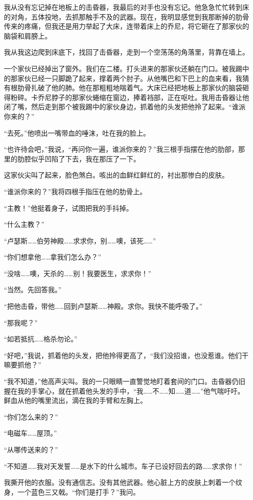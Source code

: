 \documentclass[AutoFakeBold=true]{book}
\begin{document}
我从没有忘记掉在地板上的击昏器，我最后的对手也没有忘记。他急急忙忙转到床的对角，五体投地，去抓那触手不及的武器。现在，我明显感觉到我那断掉的肋骨传来的疼痛，但我还是用力举起了大床，连带着床上的乔尼，将它砸在了那家伙的脑袋和肩膀上。

我从我这边爬到床底下，找回了击昏器，走到一个空荡荡的角落里，背靠在墙上。

一个家伙已经掉出了窗外。我们在二楼。打头进来的那家伙还躺在门口。被我踢中的那家伙已经一只脚跪了起来，撑着两个肘子。从他嘴巴和下巴上的血来看，我猜有根肋骨扎破了他的肺。他在那粗粗地喘着气。大床已经把地板上那家伙的脑袋砸得粉碎。卡乔尼脖子的那家伙蜷缩在窗边，捧着裆部，正在呕吐。我用击昏器让他闭了嘴，然后走到那个被我踢中的家伙身边，抓着他的头发把他拎了起来。``谁派你来的？''

``去死。''他喷出一嘴带血的唾沫，吐在我的脸上。

``也许待会吧，''我说，``再问你一遍，谁派你来的？''我三根手指摆在他的肋部，那里的肋腔似乎凹陷了下去，我在那压了一下。

这家伙尖叫了起来，脸色煞白。咳出的血鲜红鲜红的，衬出那惨白的皮肤。

``谁派你来的？''我将四根手指压在他的肋骨上。

``主教！''他挺着身子，试图把我的手抖掉。

``什么主教？''

``卢瑟斯……伯劳神殿……求求你，别……噢，该死……''

``你们想拿他……拿我们怎么办？''

``没啥……噢，天杀的……别！我要医生，求求你！''

``当然。先回答我。''

``把他击昏，带他……回到卢瑟斯……神殿。求你。我快不能呼吸了。''

``那我呢？''

``如若抵抗……格杀勿论。''

``好吧，''我说，抓着他的头发，把他拎得更高了，``我们没招谁，也没惹谁。他们干嘛要抓他？''

``我不知道，''他高声尖叫。我的一只眼睛一直警觉地盯着套间的门口。击昏器仍旧握在我的手掌心，就在抓着他头发的手中，``我……不……知……道……''他气喘吁吁。鲜血从他的嘴里流出，滴在我的手臂和左胸上。

``你们怎么来的？''

``电磁车……屋顶。''

``从哪传送来的？''

``不知道……我对天发誓……是水下的什么城市。车子已设好回去的路……求求你！''

我撕开他的衣服。没有通信志。没有其他武器。他心脏上方的皮肤上刺着一个纹身，一个蓝色三又戟。``你们是打手？''我问。
\end{document}
